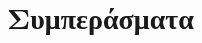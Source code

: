 \documentclass[10pt,aspectratio=169,compress]{beamer}
\begin{document}
\section{Συμπεράσματα}



\end{document}
